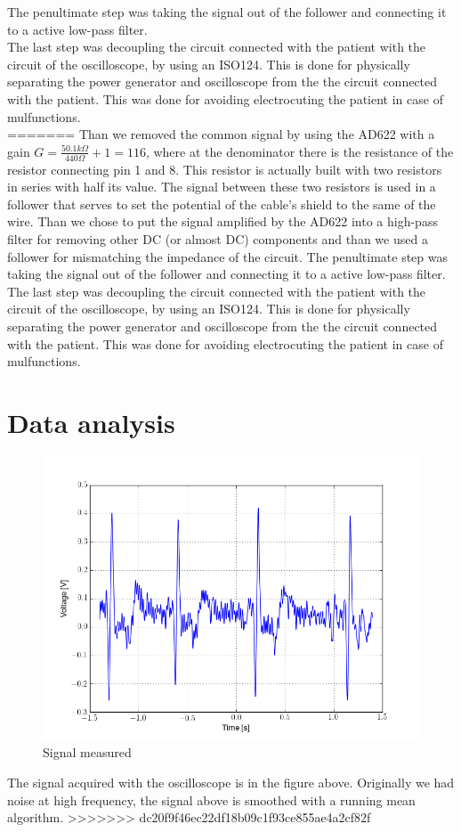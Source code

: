 The penultimate step was taking the signal out of the follower and connecting it to a active low-pass filter.\\

The last step was decoupling the circuit connected with the patient with the circuit of the oscilloscope, by using an ISO124. This is done for physically separating the power generator and oscilloscope from the the circuit connected with the patient. This was done for avoiding electrocuting the patient in case of mulfunctions.\\

=======
Than we removed the common signal by using the AD622 with a gain $G = \frac{50.1 k\Omega}{440 \Omega} + 1 = 116$, where at the denominator there is the resistance of the resistor connecting pin 1 and 8. This resistor is actually built with two resistors in series with half its value. The signal between these two resistors is used in a follower that serves to set the potential of the cable's shield to the same of the wire. Than we chose to put the signal amplified by the AD622 into a high-pass filter for removing other DC (or almost DC) components and than we used a follower for mismatching the impedance of the circuit. The penultimate step was taking the signal out of the follower and connecting it to a active low-pass filter.\\
The last step was decoupling the circuit connected with the patient with the circuit of the oscilloscope, by using an ISO124. This is done for physically separating the power generator and oscilloscope from the the circuit connected with the patient. This was done for avoiding electrocuting the patient in case of mulfunctions.
\section{Data analysis}
\begin{figure}[H]
\centering
\includegraphics[width=.7\textwidth]{8/ecg.png}
\caption{Signal measured}
\end{figure}
The signal acquired with the oscilloscope is in the figure above. Originally we had noise at high frequency, the signal above is smoothed with a running mean algorithm.
>>>>>>> dc20f9f46ec22df18b09c1f93ce855ae4a2cf82f
